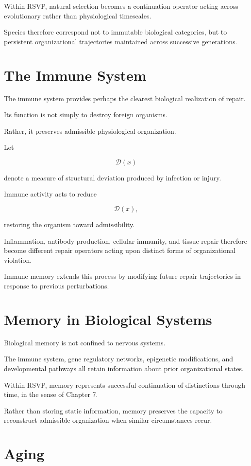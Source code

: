 \documentclass[11pt,oneside]{book}
\numberwithin{equation}{chapter}
\theoremstyle{definition}
\theoremstyle{plain}
\begin{document}
Within RSVP, natural selection becomes a continuation operator acting across
evolutionary rather than physiological timescales.

Species therefore correspond not to immutable biological categories, but to
persistent organizational trajectories maintained across successive
generations.

\section{The Immune System}

The immune system provides perhaps the clearest biological realization of
repair.

Its function is not simply to destroy foreign organisms.

Rather, it preserves admissible physiological organization.

Let

\[
\mathcal D(x)
\]

denote a measure of structural deviation produced by infection or injury.

Immune activity acts to reduce

\[
\mathcal D(x),
\]

restoring the organism toward admissibility.

Inflammation, antibody production, cellular immunity, and tissue repair
therefore become different repair operators acting upon distinct forms of
organizational violation.

Immune memory extends this process by modifying future repair trajectories
in response to previous perturbations.

\section{Memory in Biological Systems}

Biological memory is not confined to nervous systems.

The immune system, gene regulatory networks, epigenetic modifications, and
developmental pathways all retain information about prior organizational
states.

Within RSVP, memory represents successful continuation of distinctions
through time, in the sense of Chapter 7.

Rather than storing static information, memory preserves the capacity to
reconstruct admissible organization when similar circumstances recur.

\section{Aging}
\end{document}
